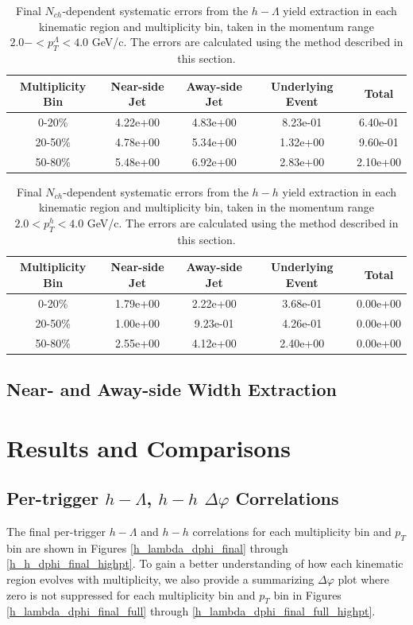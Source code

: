 \documentclass[ALICE,manyauthors]{ALICE_analysis_notes}
\begin{document}
\begin{table}[h!]
\centering
\begin{tabular}{| c || c | c | c | c | }
\hline
Multiplicity Bin & Near-side Jet & Away-side Jet & Underlying Event & Total  \\
\hline
0-20\% & 4.22e+00 & 4.83e+00  & 8.23e-01 & 6.40e-01 \\
20-50\% & 4.78e+00 & 5.34e+00  & 1.32e+00 & 9.60e-01 \\
50-80\% & 5.48e+00 & 6.92e+00  & 2.83e+00 & 2.10e+00 \\
\hline
\end{tabular}
\caption{Final $N_{ch}$-dependent systematic errors from the $h-\Lambda$ yield extraction in each kinematic region and multiplicity bin, taken in the momentum range $2.0- < p_{T}^{\Lambda} < 4.0$ GeV/c. The errors are calculated using the method described in this section.}
\label{h_lambda_yield_extraction_nch_dep_systematics}
\end{table}
\begin{table}[h!]
\centering
\begin{tabular}{| c || c | c | c | c | }
\hline
Multiplicity Bin & Near-side Jet & Away-side Jet & Underlying Event & Total  \\
\hline
0-20\% & 1.79e+00   & 2.22e+00  & 3.68e-01 & 0.00e+00 \\
20-50\% & 1.00e+00 & 9.23e-01  & 4.26e-01 & 0.00e+00 \\
50-80\% & 2.55e+00 & 4.12e+00  & 2.40e+00 & 0.00e+00 \\
\hline
\end{tabular}
\caption{Final $N_{ch}$-dependent systematic errors from the $h-h$ yield extraction in each kinematic region and multiplicity bin, taken in the momentum range $2.0 < p_{T}^{h} < 4.0$ GeV/c. The errors are calculated using the method described in this section.}
\label{h_h_yield_extraction_nch_dep_systematics}
\end{table}

\clearpage

\subsection{Near- and Away-side Width Extraction}

\section{Results and Comparisons}
\label{results}
\subsection{Per-trigger $h-\Lambda$, $h-h$ $\Delta\varphi$ Correlations}
The final per-trigger $h-\Lambda$ and $h-h$ correlations for each multiplicity bin and $p_{T}$ bin are shown in Figures \ref{h_lambda_dphi_final} through \ref{h_h_dphi_final_highpt}. To gain a better understanding of how each kinematic region evolves with multiplicity, we also provide a summarizing $\Delta\varphi$ plot where zero is not suppressed for each multiplicity bin and $p_{T}$ bin in Figures \ref{h_lambda_dphi_final_full} through \ref{h_lambda_dphi_final_full_highpt}.
\end{document}
